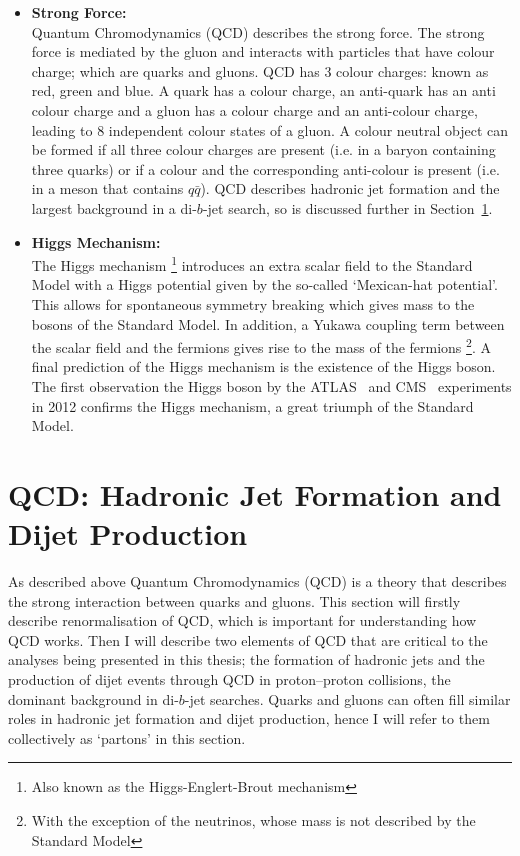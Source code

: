 \begin{itemize}[leftmargin=*]
\item\textbf{Strong Force:}\\
  Quantum Chromodynamics (QCD) describes the strong force.
  The strong force is mediated by the gluon 
  and interacts with particles that have colour charge; which are quarks and gluons.
  QCD has 3 colour charges: known as red, green and blue.
  A quark has a colour charge, an anti-quark has an anti colour charge and 
  a gluon has a colour charge and an anti-colour charge, leading to 8 independent colour states of a gluon.
  A colour neutral object can be formed if all three colour charges are present (i.e. in a baryon containing three quarks)
  or if a colour and the corresponding anti-colour is present (i.e. in a meson that contains $q\bar{q}$).
  QCD describes hadronic jet formation and the largest background in a di-$b$-jet search, so is discussed further in Section~\ref{sec:theo-qcd}.\vspace{1em}

\item\textbf{Higgs Mechanism:}\\
  The Higgs mechanism \footnote{Also known as the Higgs-Englert-Brout mechanism}
  introduces an extra scalar field to the Standard Model
  with a Higgs potential given by the so-called `Mexican-hat potential'.
  This allows for spontaneous symmetry breaking which gives mass to the bosons of the Standard Model.
  In addition, a Yukawa coupling term between the scalar field and the fermions gives rise to the mass of the fermions
  \footnote{With the exception of the neutrinos, whose mass is not described by the Standard Model}.
  A final prediction of the Higgs mechanism is the existence of the Higgs boson.
  The first observation the Higgs boson by the ATLAS~\cite{theo-higgs_atlas} and CMS~\cite{theo-higgs_cms} experiments
  in 2012 confirms the Higgs mechanism, a great triumph of the Standard Model.
\end{itemize}

\section{QCD: Hadronic Jet Formation and Dijet Production}
\label{sec:theo-qcd}

As described above Quantum Chromodynamics (QCD) is a theory that describes the strong interaction between quarks and gluons.
This section will firstly describe renormalisation of QCD, which is important for understanding how QCD works.
Then I will describe two elements of QCD that are critical to the analyses being presented in this thesis;
the formation of hadronic jets and the production of dijet events through QCD in proton--proton collisions,
the dominant background in di-$b$-jet searches.
Quarks and gluons can often fill similar roles in hadronic jet formation and dijet production, hence I will refer to them collectively as `partons' in this section.

